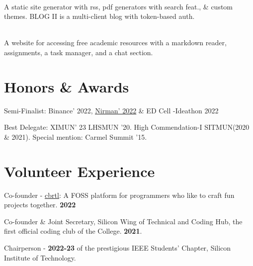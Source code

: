 \documentclass[]{assets/deedy-resume-openfont}
\begin{document}
\hfill {}\\
A static site generator with rss, pdf generators with search feat., \& custom themes. BLOG II is a multi-client blog with token-based auth. \\
\sectionsep


\hfill {}\\
A website for accessing free academic resources with a markdown reader, assignments, a task manager, and a chat section.\\

\sectionsep
%
%
\section{Honors \& Awards}
\begin{tightemize}  
\item Semi-Finalist: Binance' 2022, \href{https://nirmansilicon.tech/}{\underline{Nirman' 2022}} \& ED Cell -Ideathon 2022 \\
\item Best Delegate: XIMUN' 23 LHSMUN '20. High Commendation-I SITMUN(2020 \& 2021). Special mention: Carmel Summit '15. \\
\end{tightemize}
\section{Volunteer Experience}
\begin{tightemize} 
\item Co-founder - \underline{\href{https://cbrtl.github.io}{cbrtl}}: A FOSS platform for programmers who like to craft fun projects together. \textbf{2022}\\
\item Co-founder \& Joint Secretary, Silicon Wing of Technical and Coding Hub, the first official coding club of the College. \textbf{2021}.\\
\item Chairperson - \textbf{2022-23} of the prestigious IEEE Students’ Chapter, Silicon Institute of Technology.\\
\end{tightemize}
\ 
\end{document}
